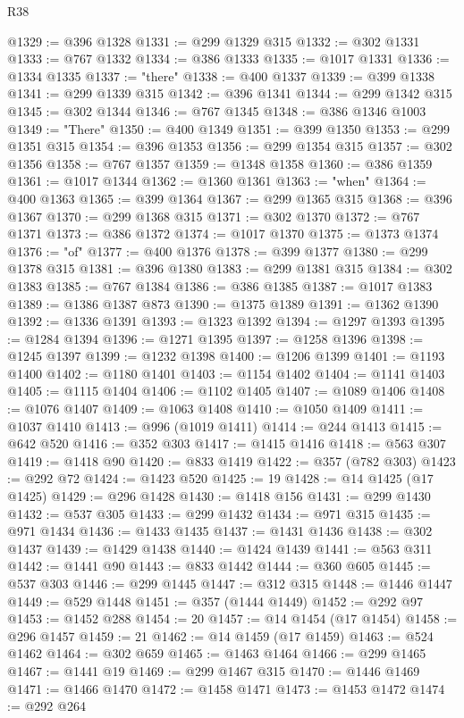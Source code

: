 \begin{lexlean}{R38}
\begin{coremodule}
@1329 := @396 @1328
@1331 := @299 @1329 @315
@1332 := @302 @1331
@1333 := @767 @1332
@1334 := @386 @1333
@1335 := @1017 @1331
@1336 := @1334 @1335
@1337 := "there"
@1338 := @400 @1337
@1339 := @399 @1338
@1341 := @299 @1339 @315
@1342 := @396 @1341
@1344 := @299 @1342 @315
@1345 := @302 @1344
@1346 := @767 @1345
@1348 := @386 @1346 @1003
@1349 := "There"
@1350 := @400 @1349
@1351 := @399 @1350
@1353 := @299 @1351 @315
@1354 := @396 @1353
@1356 := @299 @1354 @315
@1357 := @302 @1356
@1358 := @767 @1357
@1359 := @1348 @1358
@1360 := @386 @1359
@1361 := @1017 @1344
@1362 := @1360 @1361
@1363 := "when"
@1364 := @400 @1363
@1365 := @399 @1364
@1367 := @299 @1365 @315
@1368 := @396 @1367
@1370 := @299 @1368 @315
@1371 := @302 @1370
@1372 := @767 @1371
@1373 := @386 @1372
@1374 := @1017 @1370
@1375 := @1373 @1374
@1376 := "of"
@1377 := @400 @1376
@1378 := @399 @1377
@1380 := @299 @1378 @315
@1381 := @396 @1380
@1383 := @299 @1381 @315
@1384 := @302 @1383
@1385 := @767 @1384
@1386 := @386 @1385
@1387 := @1017 @1383
@1389 := @1386 @1387 @873
@1390 := @1375 @1389
@1391 := @1362 @1390
@1392 := @1336 @1391
@1393 := @1323 @1392
@1394 := @1297 @1393
@1395 := @1284 @1394
@1396 := @1271 @1395
@1397 := @1258 @1396
@1398 := @1245 @1397
@1399 := @1232 @1398
@1400 := @1206 @1399
@1401 := @1193 @1400
@1402 := @1180 @1401
@1403 := @1154 @1402
@1404 := @1141 @1403
@1405 := @1115 @1404
@1406 := @1102 @1405
@1407 := @1089 @1406
@1408 := @1076 @1407
@1409 := @1063 @1408
@1410 := @1050 @1409
@1411 := @1037 @1410
@1413 := @996 (@1019 @1411)
@1414 := @244 @1413
@1415 := @642 @520
@1416 := @352 @303
@1417 := @1415 @1416
@1418 := @563 @307
@1419 := @1418 @90
@1420 := @833 @1419
@1422 := @357 (@782 @303)
@1423 := @292 @72
@1424 := @1423 @520
@1425 := 19
@1428 := @14 @1425 (@17 @1425)
@1429 := @296 @1428
@1430 := @1418 @156
@1431 := @299 @1430
@1432 := @537 @305
@1433 := @299 @1432
@1434 := @971 @315
@1435 := @971 @1434
@1436 := @1433 @1435
@1437 := @1431 @1436
@1438 := @302 @1437
@1439 := @1429 @1438
@1440 := @1424 @1439
@1441 := @563 @311
@1442 := @1441 @90
@1443 := @833 @1442
@1444 := @360 @605
@1445 := @537 @303
@1446 := @299 @1445
@1447 := @312 @315
@1448 := @1446 @1447
@1449 := @529 @1448
@1451 := @357 (@1444 @1449)
@1452 := @292 @97
@1453 := @1452 @288
@1454 := 20
@1457 := @14 @1454 (@17 @1454)
@1458 := @296 @1457
@1459 := 21
@1462 := @14 @1459 (@17 @1459)
@1463 := @524 @1462
@1464 := @302 @659
@1465 := @1463 @1464
@1466 := @299 @1465
@1467 := @1441 @19
@1469 := @299 @1467 @315
@1470 := @1446 @1469
@1471 := @1466 @1470
@1472 := @1458 @1471
@1473 := @1453 @1472
@1474 := @292 @264

\end{coremodule}
\end{lexlean}
